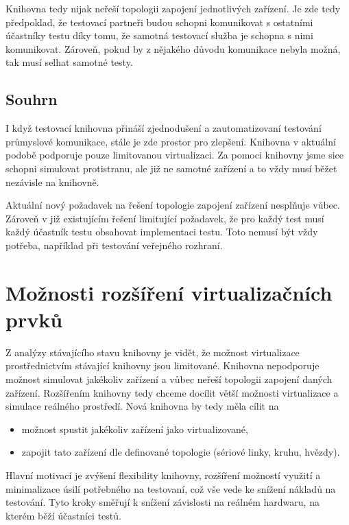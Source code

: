 Knihovna tedy nijak neřeší topologii zapojení jednotlivých zařízení. Je zde tedy předpoklad, že testovací partneři budou schopni komunikovat s ostatními účastníky testu díky tomu, že samotná testovací služba je schopna s nimi komunikovat. Zároveň, pokud by z nějakého důvodu komunikace nebyla možná, tak musí selhat samotné testy.

\subsection{Souhrn}

I když testovací knihovna přináší zjednodušení a zautomatizovaní testování průmyslové komunikace, stále je zde prostor pro zlepšení. Knihovna v aktuální podobě podporuje pouze limitovanou virtualizaci. Za pomoci knihovny jsme sice schopni simulovat protistranu, ale již ne samotné zařízení a to vždy musí běžet nezávisle na knihovně. 

Aktuální nový požadavek na řešení topologie zapojení zařízení nesplňuje vůbec. Zároveň v již existujícím řešení limitující požadavek, že pro každý test musí každý účastník testu obsahovat implementaci testu. Toto nemusí být vždy potřeba, například při testování veřejného rozhraní.

\section{Možnosti rozšíření virtualizačních prvků}

Z analýzy stávajícího stavu knihovny je vidět, že možnost virtualizace prostřednictvím stávající knihovny jsou limitované. Knihovna nepodporuje možnost simulovat jakékoliv zařízení a vůbec neřeší topologii zapojení daných zařízení. Rozšířením knihovny tedy chceme docílit větší možnosti virtualizace a simulace reálného prostředí. Nová knihovna by tedy měla cílit na

\begin{itemize}
    \item možnost spustit jakékoliv zařízení jako virtualizované,
    \item zapojit tato zařízení dle definované topologie (sériové linky, kruhu, hvězdy).
\end{itemize}

Hlavní motivací je zvýšení flexibility knihovny, rozšíření možností využití a minimalizace úsilí potřebného na testovaní, což vše vede ke snížení nákladů na testování. Tyto kroky směřují k snížení závislosti na reálném hardwaru, na kterém běží účastníci testů. 

